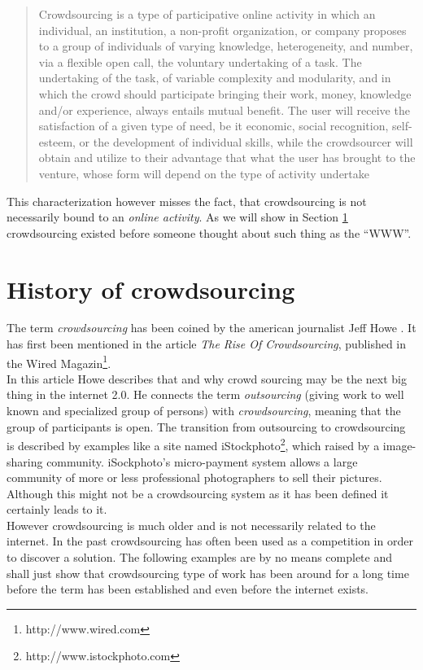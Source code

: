 \documentclass{acm_proc_article-sp}
\begin{document}
\begin{quote}
Crowdsourcing is a type of participative online activity in which an individual, an institution, a non-profit organization, or company proposes to a group of individuals of varying knowledge, heterogeneity, and number, via a flexible open call, the voluntary undertaking of a task.  The undertaking of the task, of variable complexity and modularity, and in which the crowd should participate bringing their work, money, knowledge and/or experience, always entails mutual benefit. The user will receive the satisfaction of a given type of need, be it economic, social recognition, self-esteem, or the development of individual skills, while the crowdsourcer will obtain and utilize to their advantage that what the user has brought to the venture, whose form will depend on the type of activity undertake
\end{quote}
This characterization however misses the fact, that crowdsourcing is not necessarily bound to an \textit{online activity}. As we will show in Section \ref{sect:history} crowdsourcing existed before someone thought about such thing as the ``WWW''.

\section{History of crowdsourcing}
\label{sect:history}
The term \textit{crowdsourcing} has been coined by the american journalist Jeff Howe \cite{howe:rise}. It has first been mentioned in the article \textit{The Rise Of Crowdsourcing}, published in the Wired Magazin\footnote{http://www.wired.com}. \\
In this article Howe describes that and why crowd sourcing may be the next big thing in the internet 2.0. He connects the term \textit{outsourcing} (giving work to well known and specialized group of persons) with \textit{crowdsourcing}, meaning that the group of participants is open. The transition from outsourcing to crowdsourcing is described by examples like a site named iStockphoto\footnote{http://www.istockphoto.com}, which raised by a image-sharing community. iSockphoto's micro-payment system allows a large community of more or less professional photographers to sell their pictures. Although this might not be a crowdsourcing system as it has been defined it certainly leads to it.\\
However crowdsourcing is much older and is not necessarily related to the internet. In the past crowdsourcing has often been used as a competition in order to discover a solution. The following examples are by no means complete and shall just show that crowdsourcing type of work has been around for a long time before the term has been established and even before the internet exists.
\end{document}
